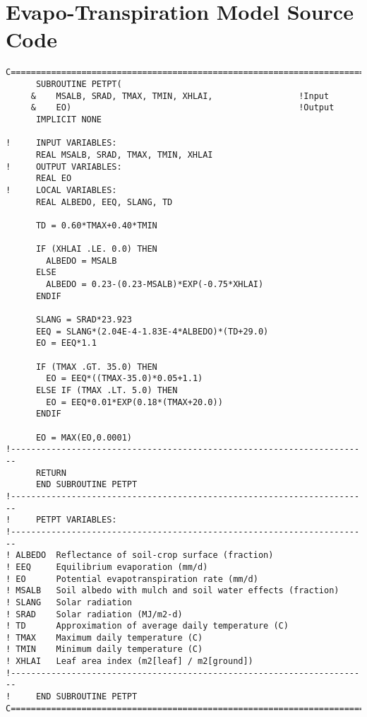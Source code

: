 \chapter{Evapo-Transpiration Model Source Code\label{appendix:a}}

\begin{verbatim}
C=======================================================================
      SUBROUTINE PETPT(
     &    MSALB, SRAD, TMAX, TMIN, XHLAI,                 !Input
     &    EO)                                             !Output
      IMPLICIT NONE

!     INPUT VARIABLES:
      REAL MSALB, SRAD, TMAX, TMIN, XHLAI
!     OUTPUT VARIABLES:
      REAL EO
!     LOCAL VARIABLES:
      REAL ALBEDO, EEQ, SLANG, TD

      TD = 0.60*TMAX+0.40*TMIN

      IF (XHLAI .LE. 0.0) THEN
        ALBEDO = MSALB
      ELSE
        ALBEDO = 0.23-(0.23-MSALB)*EXP(-0.75*XHLAI)
      ENDIF

      SLANG = SRAD*23.923
      EEQ = SLANG*(2.04E-4-1.83E-4*ALBEDO)*(TD+29.0)
      EO = EEQ*1.1

      IF (TMAX .GT. 35.0) THEN
        EO = EEQ*((TMAX-35.0)*0.05+1.1)
      ELSE IF (TMAX .LT. 5.0) THEN
        EO = EEQ*0.01*EXP(0.18*(TMAX+20.0))
      ENDIF

      EO = MAX(EO,0.0001)
!-----------------------------------------------------------------------
      RETURN
      END SUBROUTINE PETPT
!-----------------------------------------------------------------------
!     PETPT VARIABLES:
!-----------------------------------------------------------------------
! ALBEDO  Reflectance of soil-crop surface (fraction)
! EEQ     Equilibrium evaporation (mm/d)
! EO      Potential evapotranspiration rate (mm/d)
! MSALB   Soil albedo with mulch and soil water effects (fraction)
! SLANG   Solar radiation
! SRAD    Solar radiation (MJ/m2-d)
! TD      Approximation of average daily temperature (C)
! TMAX    Maximum daily temperature (C)
! TMIN    Minimum daily temperature (C)
! XHLAI   Leaf area index (m2[leaf] / m2[ground])
!-----------------------------------------------------------------------
!     END SUBROUTINE PETPT
C=======================================================================
\end{verbatim}

